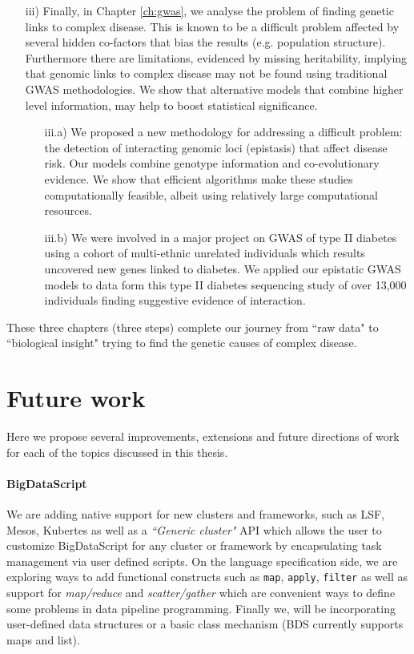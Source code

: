 \begin{itemize}
\item[iii)] Finally, in Chapter \ref{ch:gwas}, we analyse the problem of finding genetic links to complex disease. 
This is known to be a difficult problem affected by several hidden co-factors that bias the results (e.g. population structure). 
Furthermore there are limitations, evidenced by missing heritability, implying that genomic links to complex disease may not be found using traditional GWAS methodologies. 
We show that alternative models that combine higher level information, may help to boost statistical significance. 

	\begin{itemize}
		\item[iii.a)] We proposed a new methodology for addressing a difficult problem: the detection of interacting genomic loci (epistasis) that affect disease risk. 
		Our models combine genotype information and co-evolutionary evidence. We show that efficient algorithms make these studies computationally feasible, albeit using relatively large computational resources.
	
		\item[iii.b)] We were involved in a major project on GWAS of type II diabetes using a cohort of multi-ethnic unrelated individuals which results uncovered new genes linked to diabetes. 
		We applied our epistatic GWAS models to data form this type II diabetes sequencing study of over 13,000 individuals finding suggestive evidence of interaction.
			\end{itemize}
	
\end{itemize}

These three chapters (three steps) complete our journey from ``raw data" to ``biological insight" trying to find the genetic causes of complex disease.

\section{Future work}

Here we propose several improvements, extensions and future directions of work for each of the topics discussed in this thesis. \\

\paragraph{BigDataScript}
We are adding native support for new clusters and frameworks, such as LSF, Mesos, Kubertes as well as a \textit{``Generic cluster"} API which allows the user to customize BigDataScript for any cluster or framework by encapsulating task management via user defined scripts. 
On the language specification side, we are exploring ways to add functional constructs such as \texttt{map}, \texttt{apply}, \texttt{filter} as well as support for \textit{map/reduce} and \textit{scatter/gather} which are convenient ways to define some problems in data pipeline programming. 
Finally we, will be incorporating user-defined data structures or a basic class mechanism (BDS currently supports maps and list).

